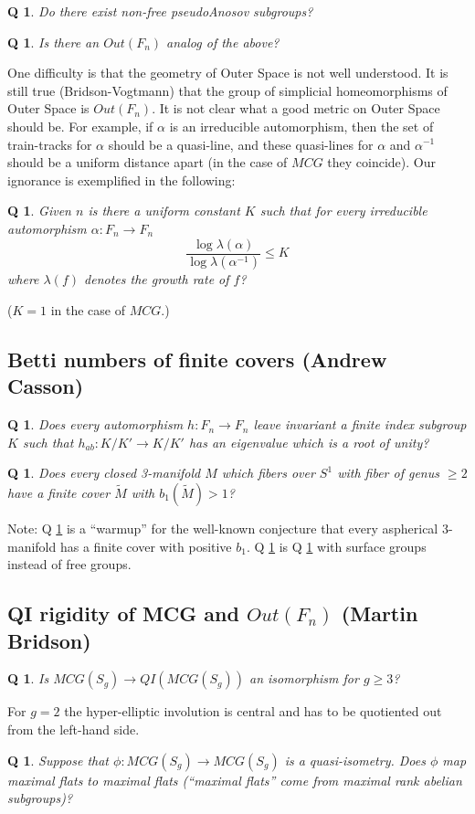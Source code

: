 \documentclass[11pt]{article}
\newtheorem{q}[thm]{Q}
\theoremstyle{remark}
\def\b{\begin{q}}
\def\e{\end{q}}
\newcommand{\<}{\langle}
\renewcommand{\>}{\rangle}
\begin{document}
\b Do there exist non-free pseudoAnosov subgroups?\e

\b Is there an $Out(F_n)$ analog of the above? \e

One difficulty is that the geometry of Outer Space is not well understood. It
is still true (Bridson-Vogtmann) that the group of simplicial homeomorphisms
of Outer Space is $Out(F_n)$. It is not clear what a good metric on Outer
Space should be. For example, if $\alpha$ is an irreducible automorphism, then
the set of train-tracks for $\alpha$ should be a quasi-line, and these
quasi-lines for $\alpha$ and $\alpha^{-1}$ should be a uniform distance apart
(in the case of $MCG$ they coincide). Our ignorance is exemplified in the
following:

\b Given $n$ is there a uniform constant $K$ such that for every irreducible
   automorphism $\alpha:F_n\to F_n$
   $$\frac{\log\lambda(\alpha)}{\log\lambda(\alpha^{-1})}\leq K$$ where
   $\lambda(f)$ denotes the growth rate of $f$?\e ($K=1$ in the case of $MCG$.)

\subsection{Betti numbers of finite covers (Andrew Casson)}

\b \label{1}
Does every automorphism $h:F_n\to  F_n$ leave invariant a finite index
   subgroup $K$ such that $h_{ab}:K/K'\to K/K'$ has an eigenvalue which is a
   root of unity?\e

\b \label{2}
Does every closed 3-manifold $M$ which fibers over $S^1$ with fiber of
   genus $\geq 2$ have a finite cover $\tilde M$ with $b_1(\tilde M)>1$?\e
   
   Note: Q \ref{2} is a ``warmup'' for the well-known conjecture that every
   aspherical 3-manifold has a finite cover with positive $b_1$. Q \ref{2} is
   Q \ref{1} with surface groups instead of free groups.

\subsection{QI rigidity of MCG and $Out(F_n)$ (Martin Bridson)}

\b Is $MCG(S_g)\to QI(MCG(S_g))$ an isomorphism for $g\geq 3$? \e
For $g=2$ the
hyper-elliptic involution is central and has to be quotiented out from the
left-hand side.

\b Suppose that $\phi:MCG(S_g)\to MCG(S_g)$ is a quasi-isometry. Does $\phi$
   map maximal flats to maximal flats (``maximal flats'' come from maximal
   rank abelian subgroups)?\e
\end{document}
